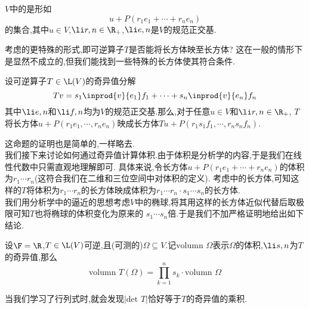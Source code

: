 \documentclass{ctexart}
\begin{document}
\begin{definition}[4.7 定义:长方体]
    $V$中的是形如
    \[u+P(r_1e_1+\cdots+r_ne_n)\]
    的集合,其中$u\in V$,$\li r,n\in\R_+$,$\li e,n$是$V$的规范正交基.
\end{definition}\noindent
考虑的更特殊的形式,即可逆算子$T$是否能将长方体映至长方体?%
这在一般的情形下是显然不成立的,但我们能找到一些特殊的长方体使其符合条件.
\begin{formal}[4.8 每个可逆算子都将某些长方体化成长方体]
    设可逆算子$T\in\L(V)$的奇异值分解
    \[Tv=s_1\inprod{v}{e_1}f_1+\cdots+s_n\inprod{v}{e_n}f_n\]
    其中$\li e,n$和$\li f,n$均为$V$的规范正交基.那么,对于任意$u\in V$和$\li r,n\in\R_+$,%
    $T$将长方体$u+P(r_1e_1,\cdots,r_ne_n)$映成长方体$Tu+P(r_1s_1f_1,\cdots,r_ns_nf_n)$.
\end{formal}\noindent
这命题的证明也是简单的,一样略去.\\
我们接下来讨论如何通过奇异值计算体积.由于体积是分析学的内容,于是我们在线性代数中只需直观地理解即可.%
具体来说,令长方体$u+P(r_1e_1+\cdots+r_ne_n)$的体积为$r_1\cdots r_n$(这符合我们在二维和三位空间中对体积的定义).%
考虑中的长方体,可知这样的$T$将体积为$r_1\cdots r_n$的长方体映成体积为$r_1\cdots r_n\cdot s_1\cdots s_n$的长方体.\\
我们用分析学中的逼近的思想考虑$V$中的椭球,将其用这样的长方体近似代替后取极限可知$T$也将椭球的体积变化为原来的%
$s_1\cdots s_n$倍.于是我们不加严格证明地给出如下结论.
\begin{formal}[4.9 体积变化倍数为奇异值的乘积]
    设$\F=\R$,$T\in\L(V)$可逆,且(可测的)$\Omega\subseteq V$.记$\text{volumn\ }\Omega$表示$\Omega$的体积,$\li s,n$为$T$的奇异值,那么
    \[\text{volumn\ }T(\Omega)=\prod_{k=1}^{n}s_k\cdot\text{volumn\ }\Omega\]
\end{formal}\noindent
当我们学习了行列式时,就会发现$|\text{det\ }T|$恰好等于$T$的奇异值的乘积.
\end{document}

